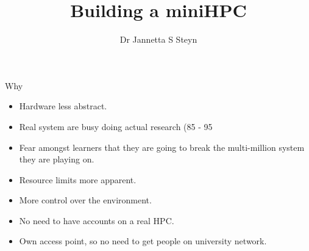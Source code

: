 \documentclass[8pt]{beamer}
\title{Building a miniHPC}
\author{Dr Jannetta S Steyn}
\begin{document}
\begin{frame}[plain]
    \maketitle
\end{frame}
\begin{frame}{Why}
	\begin{itemize}

		\item Hardware less abstract.
		\item Real system are busy doing actual research (85 - 95%
		\item Fear amongst learners that they are going to break the multi-million system they are playing on.
		\item Resource limits more apparent.
		\item More control over the environment.
		\item No need to have accounts on a real HPC.
		\item Own access point, so no need to get people on university network.
	\end{itemize}
\end{frame}
\end{document}
